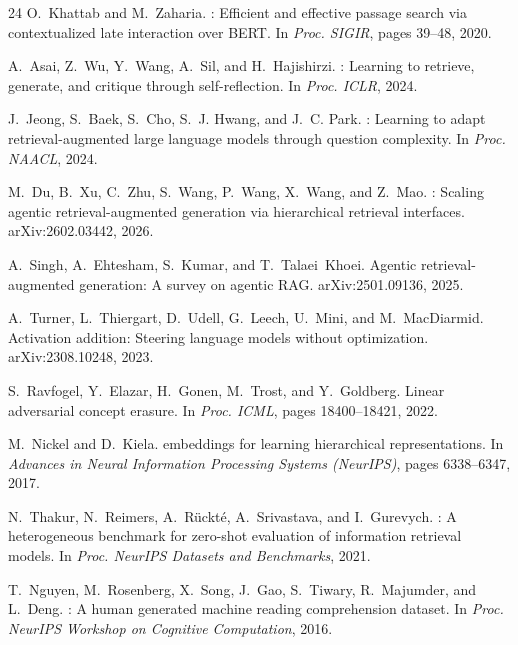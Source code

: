 \documentclass{article}
\begin{document}
\begin{thebibliography}{24}
O.~Khattab and M.~Zaharia.
: Efficient and effective passage search via contextualized late interaction over {BERT}.
\newblock In \emph{Proc. SIGIR}, pages 39--48, 2020.

A.~Asai, Z.~Wu, Y.~Wang, A.~Sil, and H.~Hajishirzi.
: Learning to retrieve, generate, and critique through self-reflection.
\newblock In \emph{Proc. ICLR}, 2024.

J.~Jeong, S.~Baek, S.~Cho, S.~J. Hwang, and J.~C. Park.
: Learning to adapt retrieval-augmented large language models through question complexity.
\newblock In \emph{Proc. NAACL}, 2024.

M.~Du, B.~Xu, C.~Zhu, S.~Wang, P.~Wang, X.~Wang, and Z.~Mao.
: Scaling agentic retrieval-augmented generation via hierarchical retrieval interfaces.
\newblock arXiv:2602.03442, 2026.

A.~Singh, A.~Ehtesham, S.~Kumar, and T.~Talaei~Khoei.
\newblock Agentic retrieval-augmented generation: A survey on agentic {RAG}.
\newblock arXiv:2501.09136, 2025.

A.~Turner, L.~Thiergart, D.~Udell, G.~Leech, U.~Mini, and M.~MacDiarmid.
\newblock Activation addition: Steering language models without optimization.
\newblock arXiv:2308.10248, 2023.

S.~Ravfogel, Y.~Elazar, H.~Gonen, M.~Trost, and Y.~Goldberg.
\newblock Linear adversarial concept erasure.
\newblock In \emph{Proc. ICML}, pages 18400--18421, 2022.

M.~Nickel and D.~Kiela.
 embeddings for learning hierarchical representations.
\newblock In \emph{Advances in Neural Information Processing Systems (NeurIPS)}, pages 6338--6347, 2017.

N.~Thakur, N.~Reimers, A.~R\"{u}ckt\'{e}, A.~Srivastava, and I.~Gurevych.
: A heterogeneous benchmark for zero-shot evaluation of information retrieval models.
\newblock In \emph{Proc. NeurIPS Datasets and Benchmarks}, 2021.

T.~Nguyen, M.~Rosenberg, X.~Song, J.~Gao, S.~Tiwary, R.~Majumder, and L.~Deng.
: A human generated machine reading comprehension dataset.
\newblock In \emph{Proc. NeurIPS Workshop on Cognitive Computation}, 2016.


\end{thebibliography}
\end{document}
